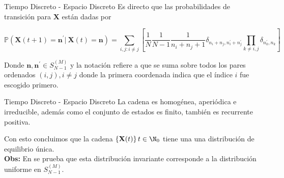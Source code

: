 \begin{frame}{Tiempo Discreto - Espacio Discreto}
Es directo que las probabilidades de transición para $\mathbf{X}$ están dadas por 
\begin{footnotesize}
 \[
     \mathbb{P} \left( \mathbf{X}(t+1) = \mathbf{n}^{\prime}|\  \mathbf{X}(t) = \mathbf{n}\right)
     = \sum\limits_{i,j:i\neq j} \left[ 
         \frac{1}{N}\frac{1}{N-1}\frac{1}{n_{i}+n_{j}+1} 
         \delta_{n_{i}+n_{j}, n_{i}^{\prime} + n_{j}^{\prime}}
         \prod\limits_{k\neq i,j} \delta_{n_{k}^{\prime},n_{k}}
     \right]
\]
\end{footnotesize}

Donde $\mathbf{n}, \mathbf{n}^{\prime}\in S_{N-1}^{(M)}$ y la notación refiere a que se suma sobre todos los pares ordenados $(i,j), i\neq j$ donde la primera coordenada indica que el índice $i$ fue escogido primero. %
\end{frame}


\begin{frame}{Tiempo Discreto - Espacio Discreto}
La cadena es homogénea, aperiódica e irreducible, además como el conjunto de estados es finito, también es recurrente positiva.

Con esto concluimos que la cadena $\left\{ \mathbf{X}(t) \right\} t\in \N_{0}$ tiene una una distribución de equilibrio única. \\
\textbf{Obs:}
En \cite{Scalas} se prueba que esta distribución invariante corresponde a la distribución uniforme en $S_{N-1}^{(M)}$. 
\end{frame}

